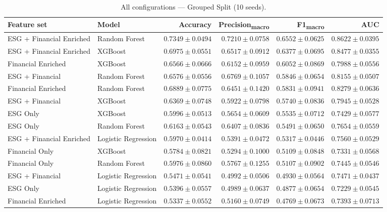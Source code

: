 \begin{table}[htbp]
  \centering
  \caption{All configurations — Grouped Split (10 seeds).}
  \label{tab:full_grouped}
  \small
  \begin{tabular}{llrrrr}
    \toprule
    Feature set & Model & Accuracy & Precision\textsubscript{macro} & F1\textsubscript{macro} & AUC \\
    \midrule
    ESG + Financial Enriched & Random Forest & $0.7349 \pm 0.0494$ & $0.7210 \pm 0.0758$ & $0.6552 \pm 0.0625$ & $0.8622 \pm 0.0395$ \\
    ESG + Financial Enriched & XGBoost & $0.6975 \pm 0.0551$ & $0.6517 \pm 0.0912$ & $0.6377 \pm 0.0695$ & $0.8477 \pm 0.0355$ \\
    Financial Enriched & XGBoost & $0.6566 \pm 0.0666$ & $0.6152 \pm 0.0959$ & $0.6052 \pm 0.0869$ & $0.7988 \pm 0.0556$ \\
    ESG + Financial & Random Forest & $0.6576 \pm 0.0556$ & $0.6769 \pm 0.1057$ & $0.5846 \pm 0.0654$ & $0.8155 \pm 0.0507$ \\
    Financial Enriched & Random Forest & $0.6889 \pm 0.0775$ & $0.6451 \pm 0.1420$ & $0.5831 \pm 0.0941$ & $0.8279 \pm 0.0636$ \\
    ESG + Financial & XGBoost & $0.6369 \pm 0.0748$ & $0.5922 \pm 0.0798$ & $0.5740 \pm 0.0836$ & $0.7945 \pm 0.0528$ \\
    ESG Only & XGBoost & $0.5996 \pm 0.0513$ & $0.5654 \pm 0.0609$ & $0.5535 \pm 0.0712$ & $0.7429 \pm 0.0577$ \\
    ESG Only & Random Forest & $0.6163 \pm 0.0543$ & $0.6407 \pm 0.0836$ & $0.5491 \pm 0.0650$ & $0.7654 \pm 0.0559$ \\
    ESG + Financial Enriched & Logistic Regression & $0.5970 \pm 0.0414$ & $0.5391 \pm 0.0472$ & $0.5317 \pm 0.0446$ & $0.7560 \pm 0.0529$ \\
    Financial Only & XGBoost & $0.5784 \pm 0.0821$ & $0.5294 \pm 0.1000$ & $0.5109 \pm 0.0848$ & $0.7331 \pm 0.0568$ \\
    Financial Only & Random Forest & $0.5976 \pm 0.0860$ & $0.5767 \pm 0.1255$ & $0.5107 \pm 0.0902$ & $0.7445 \pm 0.0546$ \\
    ESG + Financial & Logistic Regression & $0.5471 \pm 0.0541$ & $0.4992 \pm 0.0506$ & $0.4930 \pm 0.0564$ & $0.7471 \pm 0.0437$ \\
    ESG Only & Logistic Regression & $0.5396 \pm 0.0557$ & $0.4989 \pm 0.0637$ & $0.4877 \pm 0.0654$ & $0.7229 \pm 0.0545$ \\
    Financial Enriched & Logistic Regression & $0.5337 \pm 0.0552$ & $0.5160 \pm 0.0749$ & $0.4769 \pm 0.0673$ & $0.7393 \pm 0.0713$ \\

\end{tabular}
\end{table}
